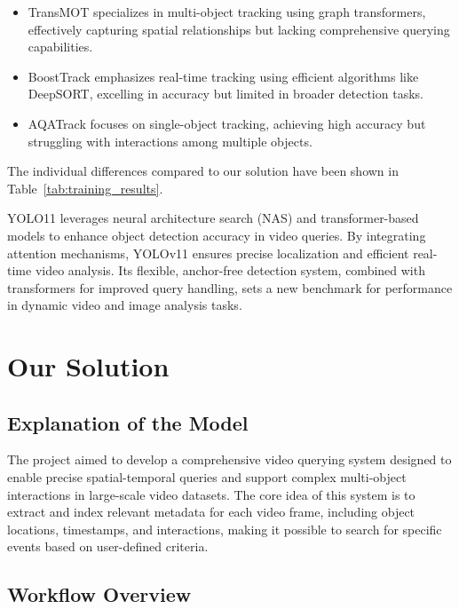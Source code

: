 \documentclass[conference]{IEEEtran}
\begin{document}
\begin{itemize} [itemsep=5pt]
    \item TransMOT\cite{chu2021transmot} specializes in multi-object tracking using graph transformers, effectively capturing spatial relationships but lacking comprehensive querying capabilities.
    \item BoostTrack\cite{stanojevic2024boostTrack} emphasizes real-time tracking using efficient algorithms like DeepSORT, excelling in accuracy but limited in broader detection tasks.
    \item AQATrack\cite{xie2024autoregressivequeriesadaptivetracking} focuses on single-object tracking, achieving high accuracy but struggling with interactions among multiple objects.\\
\end{itemize}
\par
The individual differences compared to our solution have been shown in Table~\ref{tab:training_results}.
\par
YOLO11 leverages neural architecture search (NAS) and transformer-based models to enhance object detection accuracy in video queries. By integrating attention mechanisms, YOLOv11 ensures precise localization and efficient real-time video analysis. Its flexible, anchor-free detection system, combined with transformers for improved query handling, sets a new benchmark for performance in dynamic video and image analysis tasks\cite{yolo11}.

\section{Our Solution}
\subsection{Explanation of the Model}

The project aimed to develop a comprehensive video querying system designed to enable precise spatial-temporal queries and support complex multi-object interactions in large-scale video datasets. The core idea of this system is to extract and index relevant metadata for each video frame, including object locations, timestamps, and interactions, making it possible to search for specific events based on user-defined criteria.



\subsection{Workflow Overview}
\end{document}
